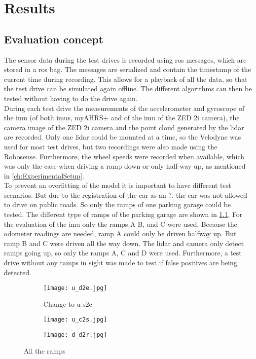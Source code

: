 \chapter{Results}
\label{ch:Results}

\section{Evaluation concept}
The sensor data during the test drives is recorded using \gls{ros} messages, which are stored in a \gls{ros} bag.
The messages are serialized and contain the timestamp of the current time during recording.
This allows for a playback of all the data, so that the test drive can be simulated again offline.
The different algorithms can then be tested without having to do the drive again.\\
During each test drive the measurements of the accelerometer and gyroscope of the \gls{imu} (of both \glspl{imu}, myAHRS+ and of the \gls{imu} of the ZED 2i camera), the camera image of the ZED 2i camera and the point cloud generated by the \gls{lidar} are recorded.
Only one \gls{lidar} could be mounted at a time, so the Velodyne was used for most test drives, but two recordings were also made using the Robosense.
Furthermore, the wheel speeds were recorded when available, which was only the case when driving a ramp down or only half-way up, as mentioned in \cref{ch:ExperimentalSetup}.\\
To prevent an overfitting of the model it is important to have different test scenarios.
But due to the registration of the car as an ?, the car was not allowed to drive on public roads.
So only the ramps of one parking garage could be tested.
The different type of ramps of the parking garage are shown in \cref{fig:all_ramps}.
For the evaluation of the \gls{imu} only the ramps A B, and C were used.
Because the odometer readings are needed, ramp A could only be driven halfway up.
But ramp B and C were driven all the way down.
The \gls{lidar} and camera only detect ramps going up, so only the ramps A, C and D were used.
Furthermore, a test drive without any ramps in sight was made to test if false positives are being detected.


\begin{figure}
    \begin{subfigure}{.3\linewidth}
        \centering
        \texttt{[image: u\_d2e.jpg]}
        \caption{Change to u s2c}
    \end{subfigure}
    \hfill
    \begin{subfigure}{.3\linewidth}
        \centering
        \texttt{[image: u\_c2s.jpg]}
        \caption{}\textbf{}
    \end{subfigure}
    \hfill
    \begin{subfigure}{.3\linewidth}
        \centering
        \texttt{[image: d\_d2r.jpg]}
        \caption{}
    \end{subfigure}
    \caption{All the ramps}
    \label{fig:all_ramps}
\end{figure}

